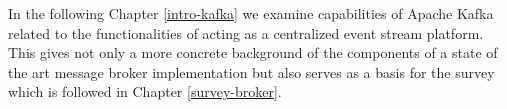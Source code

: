 In the following Chapter \ref{intro-kafka} we examine capabilities of Apache
Kafka related to the functionalities of acting as a centralized event stream
platform. This gives not only a more concrete background of the components of a
state of the art message broker implementation but also serves as a basis for
the survey which is followed in Chapter \ref{survey-broker}.



